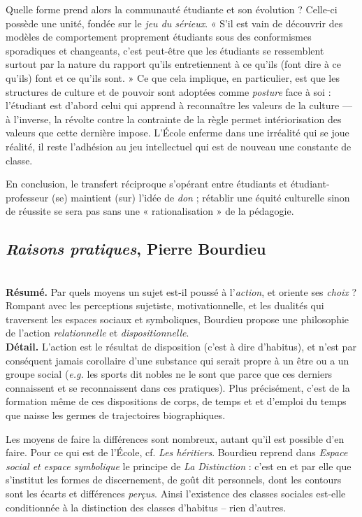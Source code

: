 \documentclass[11pt]{amsart}
\begin{document}
Quelle forme prend alors la communauté étudiante et son évolution ? Celle-ci possède une unité, fondée sur le \textsl{jeu du sérieux}. « S'il est vain de découvrir des modèles de comportement proprement étudiants sous des conformismes sporadiques et changeants, c'est peut-être que les étudiants se ressemblent surtout par la nature du rapport qu'ils entretiennent à ce qu'ils (font dire à ce qu'ils) font et ce qu'ils sont. » Ce que cela implique, en particulier,  est que les structures de culture et de pouvoir sont adoptées comme \textit{posture} face à soi : l'étudiant est d'abord celui qui apprend à reconnaître les valeurs de la culture — à l'inverse, la révolte contre la contrainte de la règle permet intériorisation des valeurs que cette dernière impose. L’École enferme dans une irréalité qui se joue réalité, il reste l'adhésion au jeu intellectuel qui est de nouveau une constante de classe.

En conclusion, le transfert réciproque s'opérant entre étudiants et étudiant-professeur (se) maintient (sur) l'idée de \textit{don} ; rétablir une équité culturelle sinon de réussite se sera pas sans une « rationalisation » de la pédagogie.
\newpage

\subsection*{\textsl{Raisons pratiques}, Pierre Bourdieu}$ $\\

\textbf{Résumé.} Par quels moyens un sujet est-il poussé à l'\textit{action}, et oriente ses \textit{choix} ? Rompant avec les perceptions sujetiste, motivationnelle, et les dualités qui traversent les espaces sociaux et symboliques, Bourdieu propose une philosophie de l'action \textit{relationnelle} et \textit{dispositionnelle}.\\

\textbf{Détail.} L'action est le résultat de disposition (c'est à dire d'habitus), et n'est par conséquent jamais corollaire d'une substance qui serait propre à un être ou a un groupe social (\textit{e.g.} les sports dit nobles ne le sont que parce que ces derniers connaissent et se reconnaissent dans ces pratiques). Plus précisément, c'est de la formation même de ces dispositions de corps, de temps et et d'emploi du temps que naisse les germes de trajectoires biographiques.

Les moyens de faire la différences sont nombreux, autant qu'il est possible d'en faire. Pour ce qui est de l’École, cf. \textsl{Les héritiers}. Bourdieu reprend dans \textsl{Espace social et espace symbolique} le principe de \textsl{La Distinction} : c'est en et par elle que s’institut les formes de discernement, de goût dit personnels, dont les contours sont les écarts et différences \textit{perçus}. Ainsi l'existence des classes sociales est-elle conditionnée à la distinction des classes d'habitus – rien d'autres. 
\end{document}
